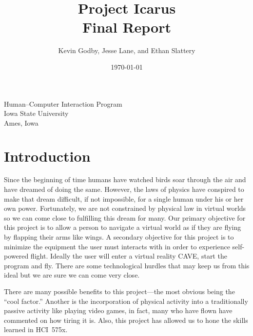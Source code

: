 \documentclass{article}
\begin{document}
\title{Project Icarus\\Final Report}
\author{Kevin Godby, Jesse Lane, and Ethan Slattery}
\date{\today}
\maketitle
{\center Human--Computer Interaction Program\\Iowa State University\\Ames, Iowa\\}

\newpage
\tableofcontents
\newpage

\section{Introduction} 
Since the beginning of time humans have watched birds soar through the air and
have dreamed of doing the same.  However, the laws of physics have conspired to
make that dream difficult, if not impossible, for a single human under his or
her own power.  Fortunately, we are not constrained by physical law in virtual
worlds so we can come close to fulfilling this dream for many.  Our primary
objective for this project is to allow a person to navigate a virtual world as
if they are flying by flapping their arms like wings.  A secondary objective
for this project is to minimize the equipment the user must interacts with in
order to experience self-powered flight.  Ideally the user will enter a virtual
reality CAVE, start the program and fly.  There are some technological hurdles
that may keep us from this ideal but we are sure we can come very close.

There are many possible benefits to this project---the most obvious being the
``cool factor.''  Another is the incorporation of physical activity into a
traditionally passive activity like playing video games, in fact, many who have
flown have commented on how tiring it is.  Also, this project has allowed us to
hone the skills learned in HCI~575x.
\end{document}
